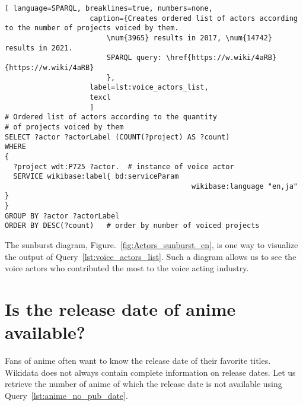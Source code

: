 \begin{lstlisting}[ language=SPARQL, breaklines=true, numbers=none,
                    caption={Creates ordered list of actors according to the number of projects voiced by them.
                        \num{3965} results in 2017, \num{14742} results in 2021.
                        SPARQL query: \href{https://w.wiki/4aRB}{https://w.wiki/4aRB}
                        },
                    label=lst:voice_actors_list,
                    texcl 
                    ]
# Ordered list of actors according to the quantity
# of projects voiced by them
SELECT ?actor ?actorLabel (COUNT(?project) AS ?count)
WHERE
{
  ?project wdt:P725 ?actor.	 # instance of voice actor
  SERVICE wikibase:label{ bd:serviceParam
			  								wikibase:language "en,ja" }
}
GROUP BY ?actor	?actorLabel
ORDER BY DESC(?count)	# order by number of voiced projects
\end{lstlisting}%

\begin{figure*}

    \setlength{\fboxsep}{0pt}%
    \setlength{\fboxrule}{1pt}%
	\caption[Sunburst diagram of number of roles voiced by different actors, 2021.]{Sunburst diagram of number of roles voiced by different actors, 2021. The diagram is constructed using the output of Query~\ref{lst:voice_actors_list} in \href{https:\\app.rawgraphs.io}{Rawgraphs}.}%
    \label{fig:Actors_sunburst_en}%
\end{figure*}

The sunburst diagram, Figure.~\ref{fig:Actors_sunburst_en}, is one way to visualize the output of Query~\ref{lst:voice_actors_list}. Such a diagram allows us to see the voice actors who contributed the most to the voice acting industry.

\section{Is the release date of anime available?}

Fans of anime often want to know the release date of their favorite titles. Wikidata does not always contain complete information on release dates. Let us retrieve the number of anime of which the release date is not available using Query~\ref{lst:anime_no_pub_date}.

